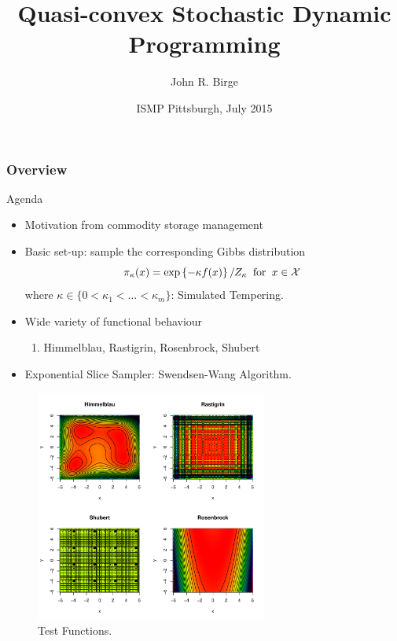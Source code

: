 \documentclass[notes=show,smaller]{beamer}
\title[Quasi-convex SDP]{Quasi-convex Stochastic Dynamic Programming}
\author{John R. Birge}
\institute[Chicago Booth]{Chicago Booth}
\date[07/15]{ISMP Pittsburgh, July 2015}
\begin{document}
\begin{frame}
\maketitle
\end{frame}

\begin{frame}
\frametitle{Overview}

\footnotesize
Agenda

\begin{itemize}
\item Motivation from commodity storage management

\item Basic set-up: sample the corresponding Gibbs distribution
$$
\pi_\kappa (x) = \exp \left \{ - \kappa f(x) \right \} / Z_\kappa \; \; {\rm for} \; \; x \in \mathcal{X} \;
$$
where $ \kappa \in \{ 0 < \kappa_1 < \ldots < \kappa_m \} $: Simulated Tempering.

\item Wide variety of functional behaviour
\begin{enumerate}
\item Himmelblau, Rastigrin, Rosenbrock, Shubert
\end{enumerate}

\item Exponential Slice Sampler:  Swendsen-Wang Algorithm.
\end{itemize}



\end{frame}
\begin{frame}

\begin{figure}[hbp]
\includegraphics[height=3in,width=\textwidth]{john-plot-new3.pdf}
\caption{Test Functions.}
\end{figure}

\end{frame}
\end{document}
